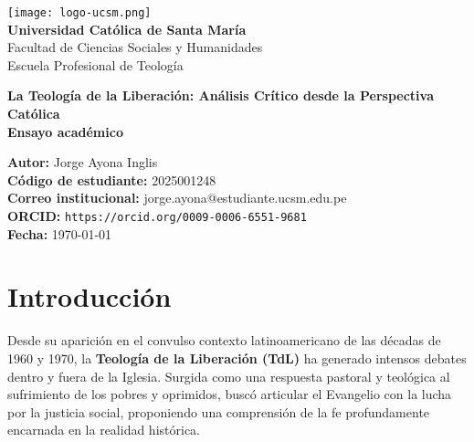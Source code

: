 \documentclass[12pt]{article}
\begin{document}
\begin{titlepage}
    \begin{center}
        \vspace*{1cm}

        \texttt{[image: logo-ucsm.png]} \\[1cm]

        \textbf{\Large Universidad Católica de Santa María} \\
        Facultad de Ciencias Sociales y Humanidades \\
        Escuela Profesional de Teología \\

        \vfill

        \textbf{\LARGE La Teología de la Liberación: Análisis Crítico desde la Perspectiva Católica} \\[0.5cm]

        \textbf{Ensayo académico} \\[0.5cm]

        \vfill

        \begin{flushleft}
        \textbf{Autor:} Jorge Ayona Inglis \\
        \textbf{Código de estudiante:} 2025001248 \\
        \textbf{Correo institucional:} jorge.ayona@estudiante.ucsm.edu.pe \\
        \textbf{ORCID:} \texttt{https://orcid.org/0009-0006-6551-9681} \\
        \textbf{Fecha:} \today \\
        \end{flushleft}

        \vfill

    \end{center}
\end{titlepage}

\section*{Introducción}

Desde su aparición en el convulso contexto latinoamericano de las décadas de 1960 y 1970, la \textbf{Teología de la Liberación (TdL)} ha generado intensos debates dentro y fuera de la Iglesia. Surgida como una respuesta pastoral y teológica al sufrimiento de los pobres y oprimidos, buscó articular el Evangelio con la lucha por la justicia social, proponiendo una comprensión de la fe profundamente encarnada en la realidad histórica.
\end{document}
